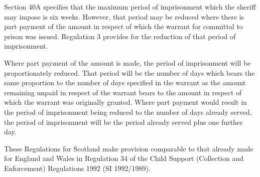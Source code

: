 \documentclass[12pt,a4paper]{article}
\begin{document}
Section 40A specifies that the maximum period of imprisonment which the sheriff may impose is six weeks. However, that period may be reduced where there is part payment of the amount in respect of which the warrant for committal to prison was issued. Regulation 3 provides for the reduction of that period of imprisonment.

Where part payment of the amount is made, the period of imprisonment will be proportionately reduced. That period will be the number of days which bears the same proportion to the number of days specified in the warrant as the amount remaining unpaid in respect of the warrant bears to the amount in respect of which the warrant was originally granted. Where part payment would result in the period of imprisonment being reduced to the number of days already served, the period of imprisonment will be the period already served plus one further day.

These Regulations for Scotland make provision comparable to that already made for England and Wales in Regulation 34 of the Child Support (Collection and Enforcement) Regulations 1992 (SI 1992/1989). 
\end{document}
